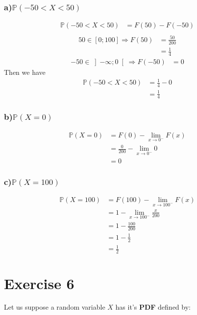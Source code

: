 \documentclass[11pt]{article}
\def\lt{<}
\begin{document}
\subsubsection*{a)$\mathbb{P}(-50\lt X \lt 50)$}
\begin{align*}
\mathbb{P}(-50\lt X \lt 50) &=F(50)-F(-50)\\
\end{align*}
\begin{align*}
50\in  \left[0 ; 100\right] \Rightarrow F(50)&=\frac{50}{200}\\
 &=\frac{1}{4}
\end{align*}
\begin{align*}
-50\in  \left]-\infty ; 0\right[ \Rightarrow F(-50)&=0
\end{align*}
Then we have
\begin{align*}
\mathbb{P}(-50\lt X \lt 50) &=\frac{1}{4}-0\\
				  &=\frac{1}{4}
\end{align*}

\subsubsection*{b)$\mathbb{P}(X=0)$}
\begin{align*}
\mathbb{P}(X=0) &=F(0)-\lim_{{x \to 0^-}} F(x)\\	
       &=\frac{0}{200}-\lim_{{x \to 0^-}} 0\\
       &=0
\end{align*}


\subsubsection*{c)$\mathbb{P}(X=100)$}
\begin{align*}
\mathbb{P}(X=100) &=F(100)-\lim_{{x \to 100^-}} F(x)\\	
       &=1-\lim_{{x \to 100^-}} \frac{x}{200}\\
       &=1-\frac{100}{200}\\
       &=1-\frac{1}{2}\\
       &=\frac{1}{2}
\end{align*}

\newpage 
    \section{Exercise 6}
    Let us suppose a random variable $X$ has it's \textbf{PDF} defined by:\\
    
\end{document}
